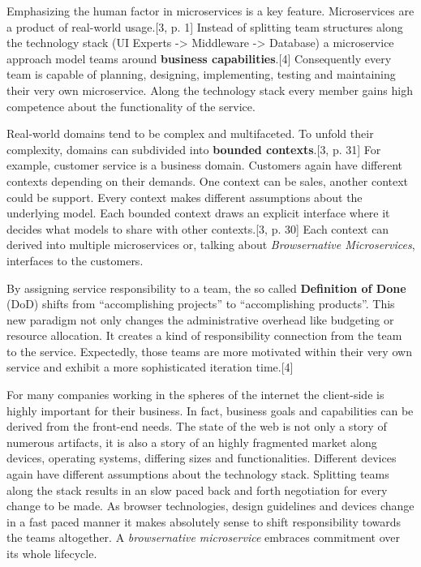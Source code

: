 \documentclass[]{article}
\begin{document}
Emphasizing the human factor in microservices is a key feature.
Microservices are a product of real-world usage.{[}3, p. 1{]} Instead of
splitting team structures along the technology stack (UI Experts
-\textgreater{} Middleware -\textgreater{} Database) a microservice
approach model teams around \textbf{business capabilities}.{[}4{]}
Consequently every team is capable of planning, designing, implementing,
testing and maintaining their very own microservice. Along the
technology stack every member gains high competence about the
functionality of the service.

Real-world domains tend to be complex and multifaceted. To unfold their
complexity, domains can subdivided into \textbf{bounded contexts}.{[}3,
p. 31{]} For example, customer service is a business domain. Customers
again have different contexts depending on their demands. One context
can be sales, another context could be support. Every context makes
different assumptions about the underlying model. Each bounded context
draws an explicit interface where it decides what models to share with
other contexts.{[}3, p. 30{]} Each context can derived into multiple
microservices or, talking about \emph{Browsernative Microservices},
interfaces to the customers.

By assigning service responsibility to a team, the so called
\textbf{Definition of Done} (DoD) shifts from ``accomplishing projects''
to ``accomplishing products''. This new paradigm not only changes the
administrative overhead like budgeting or resource allocation. It
creates a kind of responsibility connection from the team to the
service. Expectedly, those teams are more motivated within their very
own service and exhibit a more sophisticated iteration time.{[}4{]}

For many companies working in the spheres of the internet the
client-side is highly important for their business. In fact, business
goals and capabilities can be derived from the front-end needs. The
state of the web is not only a story of numerous artifacts, it is also a
story of an highly fragmented market along devices, operating systems,
differing sizes and functionalities. Different devices again have
different assumptions about the technology stack. Splitting teams along
the stack results in an slow paced back and forth negotiation for every
change to be made. As browser technologies, design guidelines and
devices change in a fast paced manner it makes absolutely sense to shift
responsibility towards the teams altogether. A \emph{browsernative
microservice} embraces commitment over its whole lifecycle.
\end{document}
